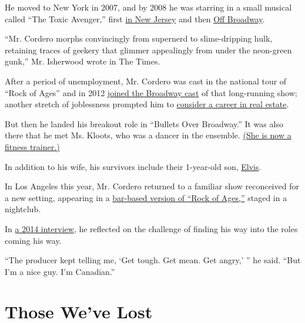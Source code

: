 He moved to New York in 2007, and by 2008 he was starring in a small
musical called ``The Toxic Avenger,'' first
\href{https://www.nytimes3xbfgragh.onion/2008/10/19/nyregion/new-jersey/19theatnj.html}{in
New Jersey} and then
\href{https://www.nytimes3xbfgragh.onion/2009/04/07/theater/reviews/07toxi.html}{Off
Broadway}.

``Mr. Cordero morphs convincingly from supernerd to slime-dripping hulk,
retaining traces of geekery that glimmer appealingly from under the
neon-green gunk,'' Mr. Isherwood wrote in The Times.

After a period of unemployment, Mr. Cordero was cast in the national
tour of ``Rock of Ages'' and in 2012
\href{https://www.broadwayworld.com/article/ROCK-OF-AGES-Welcomes-Nick-Cordero-to-the-Cast-as-Dennis-924-20120921}{joined
the Broadway cast} of that long-running show; another stretch of
joblessness prompted him to
\href{https://www.broadway.com/buzz/175841/tony-nominated-bullets-star-nick-cordero-on-quitting-school-getting-in-trouble-woody-allens-comedy-tips/}{consider
a career in real estate}.

But then he landed his breakout role in ``Bullets Over Broadway.'' It
was also there that he met Ms. Kloots, who was a dancer in the ensemble.
\href{https://amandakloots.com/}{(She is now a fitness trainer.)}

In addition to his wife, his survivors include their 1-year-old son,
\href{https://www.playbill.com/article/broadways-nick-cordero-and-amanda-kloots-welcome-first-child}{Elvis}.

In Los Angeles this year, Mr. Cordero returned to a familiar show
reconceived for a new setting, appearing in a
\href{https://www.latimes.com/entertainment-arts/story/2020-01-15/rock-of-ages-hollywood-bourbon-room}{bar-based
version of ``Rock of Ages,''} staged in a nightclub.

In \href{https://nyti.ms/1qc1E17}{a 2014 interview}, he reflected on the
challenge of finding his way into the roles coming his way.

``The producer kept telling me, `Get tough. Get mean. Get angry,' '' he
said. ``But I'm a nice guy. I'm Canadian.''

\href{https://www.nytimes3xbfgragh.onion/interactive/2020/obituaries/people-died-coronavirus-obituaries.html?action=click\&pgtype=Article\&state=default\&region=BELOW_MAIN_CONTENT\&context=covid_obits_promo}{}

\hypertarget{those-weve-lost}{%
\section{Those We've Lost}\label{those-weve-lost}}

